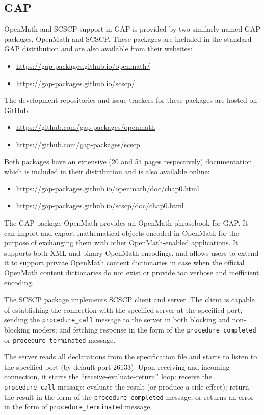 \documentclass{deliverablereport}
\begin{document}
\subsection{GAP}

OpenMath and SCSCP support in GAP is provided by two similarly named GAP packages, 
{\sf OpenMath} and {\sf SCSCP}. These packages are included in the 
standard GAP distribution and are also available from their 
websites:
\begin{itemize}
\item
\url{https://gap-packages.github.io/openmath/}
\item
\url{https://gap-packages.github.io/scscp/}
\end{itemize}
The development repositories and issue trackers for these packages are hosted on GitHub:
\begin{itemize}
\item
\url{https://github.com/gap-packages/openmath}
\item
\url{https://github.com/gap-packages/scscp}
\end{itemize}
Both packages have an extensive (20 and 54 pages respectively) documentation 
which is included in their distribution and is also available online:
\begin{itemize}
\item
\url{https://gap-packages.github.io/openmath/doc/chap0.html}
\item
\url{https://gap-packages.github.io/scscp/doc/chap0.html}
\end{itemize}

The GAP package OpenMath provides an OpenMath phrasebook for GAP.
It can import and export mathematical objects encoded in OpenMath
for the purpose of exchanging them with other OpenMath-enabled 
applications. It supports both XML and binary OpenMath encodings, 
and allows users to extend it to support private OpenMath content
dictionaries in case when the official OpenMath content dictionaries
do not exist or provide too verbose and inefficient encoding.

The SCSCP package implements SCSCP client and server. 
The client is capable of establishing the connection with the specified server
at the specified port; sending the {\tt procedure\_call} message to
the server in both blocking and non-blocking moders; and fetching
response in the form of the {\tt procedure\_completed} or
{\tt procedure\_terminated} message. 

The server reads all declarations from the specification file and starts
to listen to the specified port (by default port 26133). Upon receiving 
and incoming connection, it starts the ``receive-evaluate-return'' loop:
receive the {\tt procedure\_call} message; evaluate the result 
(or produce a side-effect); return the result in the form of the
{\tt procedure\_completed} message, or returns an error in the form
of {\tt procedure\_terminated} message.
\end{document}
